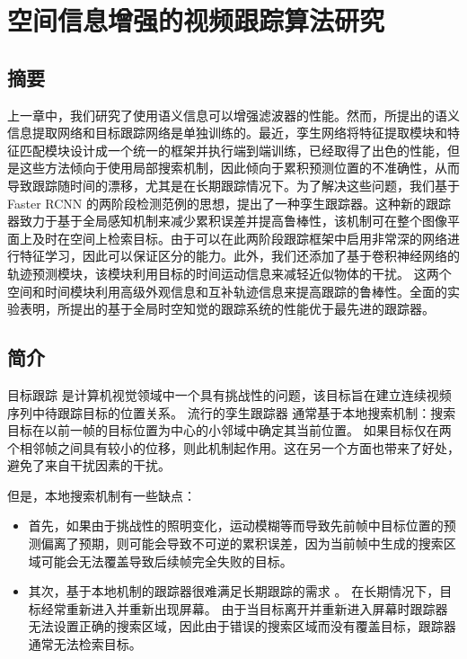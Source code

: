 \chapter{空间信息增强的视频跟踪算法研究}\label{chap:globally}

\section{摘要}
上一章中，我们研究了使用语义信息可以增强滤波器的性能。然而，所提出的语义信息提取网络和目标跟踪网络是单独训练的。最近，孪生网络将特征提取模块和特征匹配模块设计成一个统一的框架并执行端到端训练，已经取得了出色的性能，但是这些方法倾向于使用局部搜索机制，因此倾向于累积预测位置的不准确性，从而导致跟踪随时间的漂移，尤其是在长期跟踪情况下。为了解决这些问题，我们基于 Faster RCNN 的两阶段检测范例的思想，提出了一种孪生跟踪器。这种新的跟踪器致力于基于全局感知机制来减少累积误差并提高鲁棒性，该机制可在整个图像平面上及时在空间上检索目标。由于可以在此两阶段跟踪框架中启用非常深的网络进行特征学习，因此可以保证区分的能力。此外，我们还添加了基于卷积神经网络的轨迹预测模块，该模块利用目标的时间运动信息来减轻近似物体的干扰。
这两个空间和时间模块利用高级外观信息和互补轨迹信息来提高跟踪的鲁棒性。全面的实验表明，所提出的基于全局时空知觉的跟踪系统的性能优于最先进的跟踪器。

\section{简介}
\label{sec:intro}

目标跟踪 \cite{Leang2018OnlineFO, Wang2019VisualOT, Zhang2018UsingFL} 是计算机视觉领域中一个具有挑战性的问题，该目标旨在建立连续视频序列中待跟踪目标的位置关系。
流行的孪生跟踪器 \cite{SiamFC, SiamRPN, Wang2018SiamMask} 通常基于本地搜索机制：搜索目标在以前一帧的目标位置为中心的小邻域中确定其当前位置。
如果目标仅在两个相邻帧之间具有较小的位移，则此机制起作用。这在另一个方面也带来了好处，避免了来自干扰因素的干扰。

但是，本地搜索机制有一些缺点：

\begin{itemize}
\item 首先，如果由于挑战性的照明变化，运动模糊等而导致先前帧中目标位置的预测偏离了预期，则可能会导致不可逆的累积误差，因为当前帧中生成的搜索区域可能会无法覆盖导致后续帧完全失败的目标。
\item 其次，基于本地机制的跟踪器很难满足长期跟踪的需求 \cite{kalal2011tracking, hong2015multi}。
在长期情况下，目标经常重新进入并重新出现屏幕。
由于当目标离开并重新进入屏幕时跟踪器无法设置正确的搜索区域，因此由于错误的搜索区域而没有覆盖目标，跟踪器通常无法检索目标。
\end{itemize}


